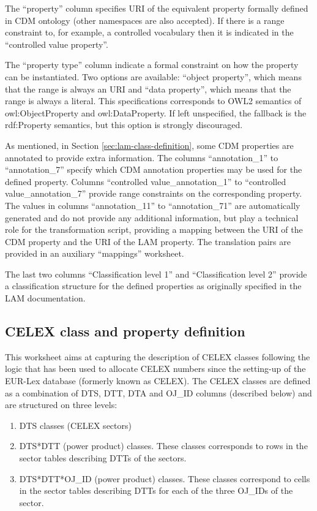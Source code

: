 The ``property'' column specifies URI of the equivalent property formally
defined in CDM ontology (other namespaces are also accepted). If there
is a range constraint to, for example, a controlled vocabulary then it
is indicated in the ``controlled value property''.

The ``property type'' column indicate a formal constraint on how the property can be instantiated. Two options are available: ``object property'', which means that the range is always an URI and ``data property'', which means that the range is always a literal. This specifications corresponds to OWL2 semantics of owl:ObjectProperty and owl:DataProperty. If left unspecified, the fallback is the rdf:Property semantics, but this option is strongly discouraged. 

As mentioned, in Section \ref{sec:lam-class-definition}, some CDM properties are annotated to provide
extra information. The columns ``annotation\_1'' to ``annotation\_7'' specify which CDM annotation properties may be used for the defined
property. Columns ``controlled value\_annotation\_1'' to ``controlled
value\_annotation\_7'' provide range constraints on the corresponding
property. The values in columns ``annotation\_11'' to ``annotation\_71'' are
automatically generated and do not provide any additional information,
but play a technical role for the transformation script, providing a
mapping between the URI of the CDM property and the URI of the LAM
property. The translation pairs are provided in an auxiliary ``mappings'' worksheet.

The last two columns ``Classification level 1'' and ``Classification level
2'' provide a classification structure for the defined properties as
originally specified in the LAM documentation.



\subsection{CELEX class and property definition}

This worksheet aims at capturing the description of CELEX classes
following the logic that has been used to allocate CELEX numbers since
the setting-up of the EUR-Lex database (formerly known as CELEX). The
CELEX classes are defined as a combination of DTS, DTT, DTA and OJ\_ID
columns (described below) and are structured on three levels:

\begin{enumerate}
\item
  DTS classes (CELEX sectors)
\item
  DTS*DTT (power product) classes. These classes corresponds to rows in
  the sector tables describing DTTs of the sectors.
\item
  DTS*DTT*OJ\_ID (power product) classes. These classes correspond to
  cells in the sector tables describing DTTs for each of the three
  OJ\_IDs of the sector.
\end{enumerate}

